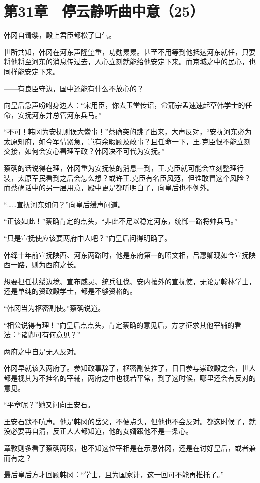 \section{第31章　停云静听曲中意（25）}

韩冈自请缨，殿上君臣都松了口气。

世所共知，韩冈在河东声隆望重，功勋累累。甚至不用等到他抵达河东就任，只要将他将至河东的消息传过去，人心立刻就能给他安定下来。而京城之中的民心，也同样能安定下来。

——有良臣守边，国中还能有什么不放心的？

向皇后急声吩咐身边人：“宋用臣，你去玉堂传诏，命蒲宗孟速速起草韩学士的任命，安抚河东并总管河东兵马。”

“不可！韩冈为安抚则误大齤事！”蔡确突的跳了出来，大声反对，“安抚河东必为太原知府，如今军情紧急，岂有余暇顾及政事？且任命一下，王.克臣恨不能立刻交接，如何会安心署理军政？韩冈决不可代为安抚。”

蔡确的话说得在理，韩冈重为安抚使的消息一到，王.克臣就可能会立刻整理行装，太原军民看到之后会怎么想？或许王.克臣有名臣风范，但谁敢冒这个风险？而蔡确话中的另一层用意，殿中更是都听明白了，向皇后也不例外。

“……宣抚河东如何？”向皇后缓声问道。

“正该如此！”蔡确肯定的点头，“非此不足以稳定河东，统御一路将帅兵马。”

“只是宣抚使应该要两府中人吧？”向皇后问得明确了。

韩绛十年前宣抚陕西、河东两路时，他是东府第一的昭文相，吕惠卿现如今宣抚陕西一路，则为西府之长。

想要担任扶绥边境、宣布威灵、统兵征伐、安内攘外的宣抚使，无论是翰林学士，还是单纯的资政殿学士，都是不够资格的。

“韩冈当为枢密副使。”蔡确说道。

“相公说得有理！”向皇后点点头，肯定蔡确的意见后，方才征求其他宰辅的看法：“诸卿可有何意见？”

两府之中自是无人反对。

韩冈早就该入两府了。参知政事辞了，枢密副使推了，日日参与崇政殿之会，世人都是视其为不挂名的宰辅，两府之中也视若平常，到了这时候，哪里还会有反对的意见。

“平章呢？”她又问向王安石。

王安石默不吭声。他是韩冈的岳父，不便点头，但他也不会反对。都这时候了，就没必要再自清，反正人人都知道，他的女婿跟他不是一条心。

章敦则多看了蔡确两眼，也不知这位宰相是在示恩韩冈，还是在讨好皇后，或者兼而有之？

最后皇后方才回顾韩冈：“学士，且为国家计，这一回可不能再推托了。”

